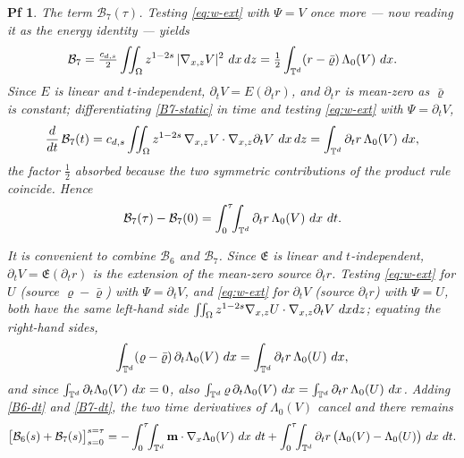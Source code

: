 \documentclass[10pt,a4paper]{amsart}
\newtheorem{pf}{Pf}
\newcommand{\Gradx}{\nabla_x}
\newcommand{\Gradxz}{\nabla_{x,z}}
\newcommand{\Lambdaz}{\Lambda_0}
\newcommand{\dt}{{\,\rm d} t }
\newcommand{\dx}{{\,\rm d} {x}}
\newcommand{\dz}{{\rm d} z}
\newcommand{\vc}[1]{{\bf #1}}
\newcommand{\vm}{\vc{m}}
\newcommand{\vr}{\varrho}
\begin{document}
\begin{pf}
\smallskip
\noindent\emph{The term $\mathcal B_7(\tau)$.} Testing \eqref{eq:w-ext} with $\Psi=V$ once more
--- now reading it as the energy identity --- yields
\begin{equation}\label{B7-static}
	\mathcal B_7 = \tfrac{c_{d,s}}2\iint_\Omega z^{1-2s}\,|\Gradxz V|^2\,\dx\,\dz
	= \tfrac12\int_{\mathbb T^d}(r-\bar\vr)\,\Lambdaz(V)\,\dx .
\end{equation}
Since $E$ is linear and $t$-independent, $\partial_t V=E(\partial_t r)$, and $\partial_t r$ is
mean-zero as $\bar\vr$ is constant; differentiating \eqref{B7-static} in time and testing
\eqref{eq:w-ext} with $\Psi=\partial_t V$,
\begin{equation}\label{B7-symm}
	\frac{d}{dt}\,\mathcal B_7(t)
	= c_{d,s}\iint_\Omega z^{1-2s}\,\Gradxz V\cdot\Gradxz\partial_t V\,\dx\,\dz
	= \int_{\mathbb T^d}\partial_t r\,\Lambdaz(V)\,\dx ,
\end{equation}
the factor $\tfrac12$ absorbed because the two symmetric contributions of the product rule
coincide. Hence
\begin{equation}\label{B7-dt}
	\mathcal B_7(\tau)-\mathcal B_7(0)
	= \int_0^\tau\!\!\int_{\mathbb T^d}\partial_t r\,\Lambdaz(V)\,\dx\,\dt .
\end{equation}

It is convenient to combine $\mathcal B_6$ and $\mathcal B_7$. Since $\mathfrak{E}$ is linear and
$t$-independent, $\partial_t V=\mathfrak{E}(\partial_t r)$ is the extension of the mean-zero source
$\partial_t r$. Testing \eqref{eq:w-ext} for $U$ (source $\vr-\bar\vr$) with $\Psi=\partial_t V$,
and \eqref{eq:w-ext} for $\partial_t V$ (source $\partial_t r$) with $\Psi=U$, both have the same
left-hand side $\iint_\Omega z^{1-2s}\Gradxz U\cdot\Gradxz\partial_t V\,\dx\dz$; equating the
right-hand sides,
\[
\int_{\mathbb T^d}(\vr-\bar\vr)\,\partial_t\Lambdaz(V)\,\dx
= \int_{\mathbb T^d}\partial_t r\,\Lambdaz(U)\,\dx ,
\]
and since $\int_{\mathbb T^d}\partial_t\Lambdaz(V)\,\dx=0$, also
$\int_{\mathbb T^d}\vr\,\partial_t\Lambdaz(V)\,\dx=\int_{\mathbb T^d}\partial_t r\,\Lambdaz(U)\,\dx$.
Adding \eqref{B6-dt} and \eqref{B7-dt}, the two time derivatives of $\Lambdaz(V)$ cancel and there
remains
\begin{equation}\label{B67}
	\big[\mathcal B_6(s)+\mathcal B_7(s)\big]_{s=0}^{s=\tau}
	= -\int_0^\tau\!\!\int_{\mathbb T^d}\vm\cdot\Gradx\Lambdaz(V)\,\dx\,\dt
	+ \int_0^\tau\!\!\int_{\mathbb T^d}\partial_t r\,\big(\Lambdaz(V)-\Lambdaz(U)\big)\,\dx\,\dt .
\end{equation}



\end{pf}
\end{document}
